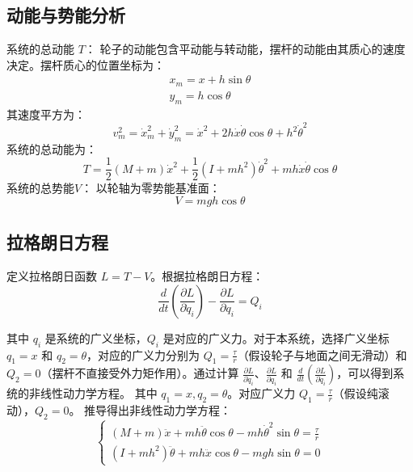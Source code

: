 \subsection{动能与势能分析}
系统的总动能 $T$：
轮子的动能包含平动能与转动能，摆杆的动能由其质心的速度决定。摆杆质心的位置坐标为：
\begin{equation}
  \begin{aligned}
    x_m = x + h\sin\theta \\
    y_m = h\cos\theta
  \end{aligned}
\end{equation}
其速度平方为：
\begin{equation}
v_m^2 = \dot{x}_m^2 + \dot{y}_m^2 = \dot{x}^2 + 2h\dot{x}\dot{\theta}\cos\theta + h^2\dot{\theta}^2
\end{equation}
系统的总动能为：
\begin{equation}
T = \frac{1}{2}(M+m)\dot{x}^2 + \frac{1}{2}(I + mh^2)\dot{\theta}^2 + mh\dot{x}\dot{\theta}\cos\theta
\end{equation}
系统的总势能$V$：
以轮轴为零势能基准面：
\begin{equation}
V = mgh\cos\theta
\end{equation}

\subsection{拉格朗日方程}
定义拉格朗日函数 $L = T - V$。根据拉格朗日方程：
\begin{equation}
\frac{d}{dt}\left(\frac{\partial L}{\partial \dot{q}_i}\right) - \frac{\partial L}{\partial q_i} = Q_i
\end{equation}

其中 $q_i$ 是系统的广义坐标，$Q_i$ 是对应的广义力。对于本系统，选择广义坐标 $q_1 = x$ 和 $q_2 = \theta$，对应的广义力分别为 $Q_1 = \frac{\tau}{r}$（假设轮子与地面之间无滑动）和 $Q_2 = 0$（摆杆不直接受外力矩作用）。通过计算 $\frac{\partial L}{\partial \dot{q}_i}$、$\frac{\partial L}{\partial q_i}$ 和 $\frac{d}{dt}\left(\frac{\partial L}{\partial \dot{q}_i}\right)$，可以得到系统的非线性动力学方程。
其中 $q_1 = x, q_2 = \theta$。对应广义力 $Q_1 = \frac{\tau}{r}$（假设纯滚动），$Q_2 = 0$。
推导得出非线性动力学方程：
\begin{equation}
\begin{cases}
(M + m)\ddot{x} + mh\ddot{\theta}\cos\theta - mh\dot{\theta}^2\sin\theta = \frac{\tau}{r} \\
(I + mh^2)\ddot{\theta} + mh\ddot{x}\cos\theta - mgh\sin\theta = 0
\end{cases}
\end{equation}

